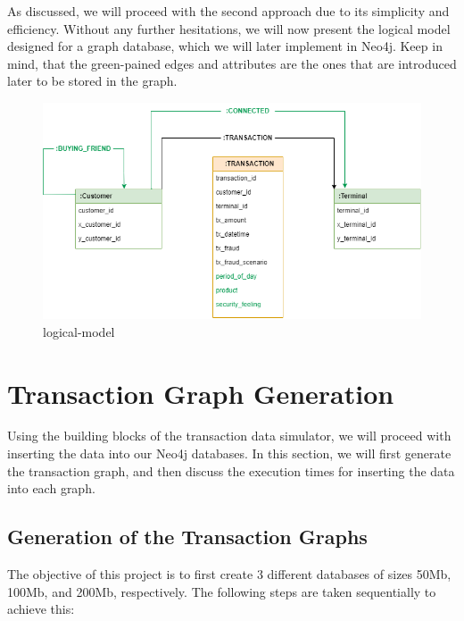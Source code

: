 As discussed, we will proceed with the second approach due to its
simplicity and efficiency. Without any further hesitations, we will now
present the logical model designed for a graph database, which we will
later implement in Neo4j. Keep in mind, that the green-pained edges and
attributes are the ones that are introduced later to be stored in the
graph.

\begin{figure}
\centering
\includegraphics{images/logical-model.png}
\caption{logical-model}
\end{figure}


    \hypertarget{transaction-graph-generation}{%
\section{Transaction Graph
Generation}\label{transaction-graph-generation}}

    Using the building blocks of the transaction data simulator, we will
proceed with inserting the data into our Neo4j databases. In this
section, we will first generate the transaction graph, and then discuss
the execution times for inserting the data into each graph.

    \hypertarget{generation-of-the-transaction-graphs}{%
\subsection{Generation of the Transaction
Graphs}\label{generation-of-the-transaction-graphs}}

    The objective of this project is to first create 3 different databases
of sizes 50Mb, 100Mb, and 200Mb, respectively. The following steps are
taken sequentially to achieve this:

